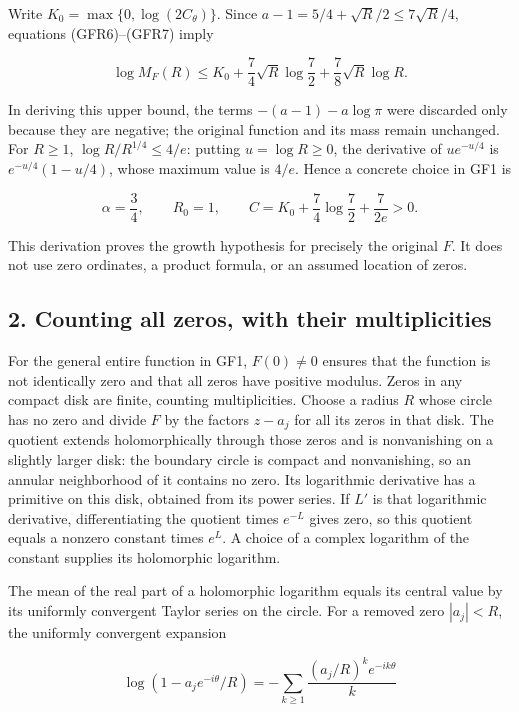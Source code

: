 Write \(K_0=\max\{0,\log(2C_\theta)\}\). Since \(a-1=5/4+\sqrt R/2\le7\sqrt R/4\), equations (GFR6)--(GFR7) imply

\[
\log M_F(R)
\le K_0+\frac74\sqrt R\log\frac72
             +\frac78\sqrt R\log R.
\tag{GFR8}
\]

In deriving this upper bound, the terms \(-(a-1)-a\log\pi\) were discarded only because they are negative; the original function and its mass remain unchanged. For \(R\ge1\), \(\log R/R^{1/4}\le4/e\): putting \(u=\log R\ge0\), the derivative of \(ue^{-u/4}\) is \(e^{-u/4}(1-u/4)\), whose maximum value is \(4/e\). Hence a concrete choice in GF1 is

\[
\alpha=\frac34,\qquad R_0=1,\qquad
C=K_0+\frac74\log\frac72+\frac7{2e}>0.
\tag{GFR9}
\]

This derivation proves the growth hypothesis for precisely the original \(F\). It does not use zero ordinates, a product formula, or an assumed location of zeros.

\subsection{2. Counting all zeros, with their multiplicities}\label{C47stage:GFR:counting-all-zeros-with-their-multiplicities}

For the general entire function in GF1, \(F(0)\ne0\) ensures that the function is not identically zero and that all zeros have positive modulus. Zeros in any compact disk are finite, counting multiplicities. Choose a radius \(R\) whose circle has no zero and divide \(F\) by the factors \(z-a_j\) for all its zeros in that disk. The quotient extends holomorphically through those zeros and is nonvanishing on a slightly larger disk: the boundary circle is compact and nonvanishing, so an annular neighborhood of it contains no zero. Its logarithmic derivative has a primitive on this disk, obtained from its power series. If \(L'\) is that logarithmic derivative, differentiating the quotient times \(e^{-L}\) gives zero, so this quotient equals a nonzero constant times \(e^L\). A choice of a complex logarithm of the constant supplies its holomorphic logarithm.

The mean of the real part of a holomorphic logarithm equals its central value by its uniformly convergent Taylor series on the circle. For a removed zero \(|a_j|<R\), the uniformly convergent expansion

\[
\log(1-a_je^{-i\theta}/R)
=-\sum_{k\ge1}\frac{(a_j/R)^ke^{-ik\theta}}k
\]

